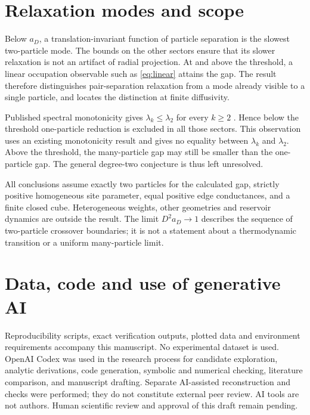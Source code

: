 \documentclass[11pt,a4paper]{article}
\begin{document}
\section{Relaxation modes and scope}
Below $a_D$, a translation-invariant function of particle separation is
the slowest two-particle mode. The bounds on the other sectors ensure
that its slower relaxation is not an artifact of radial projection.
At and above the threshold, a linear occupation observable such as
\eqref{eq:linear} attains the gap. The result therefore distinguishes
pair-separation relaxation from a mode already visible to a single
particle, and locates the distinction at finite diffusivity.

Published spectral monotonicity gives
$\lambda_k\leq\lambda_2$ for every $k\geq2$
\cite[Eq.~(2.7)]{KimSau2026}. Hence below the threshold one-particle
reduction is excluded in all those sectors. This observation uses an
existing monotonicity result and gives no equality between $\lambda_k$
and $\lambda_2$. Above the threshold, the many-particle gap may still be
smaller than the one-particle gap. The general degree-two conjecture
is thus left unresolved.

All conclusions assume exactly two particles for the calculated gap,
strictly positive homogeneous site parameter, equal positive edge
conductances, and a finite closed cube. Heterogeneous weights, other
geometries and reservoir dynamics are outside the result. The limit
$D^2a_D\to1$ describes the sequence of two-particle crossover boundaries;
it is not a statement about a thermodynamic transition or a uniform
many-particle limit.

\section*{Data, code and use of generative AI}
Reproducibility scripts, exact verification outputs, plotted data and
environment requirements accompany this manuscript. No experimental
dataset is used. OpenAI Codex was used in the research process for
candidate exploration, analytic derivations, code generation, symbolic
and numerical checking, literature comparison, and manuscript drafting.
Separate AI-assisted reconstruction and checks were performed; they do
not constitute external peer review. AI tools are not authors. Human
scientific review and approval of this draft remain pending.

\begingroup
\small
\setlength{\bibsep}{4pt}


\endgroup
\end{document}
